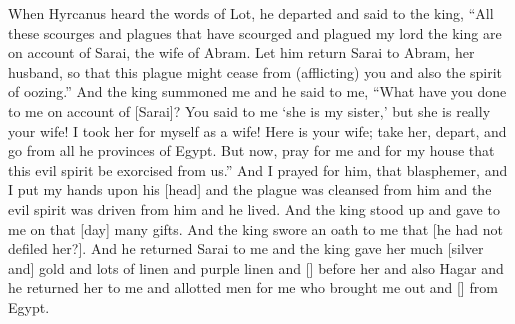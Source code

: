 \begin{translation}
    When Hyrcanus heard  the words of Lot, he departed and said to the king, ``All these scourges and plagues
    that have scourged and plagued my lord the king  are on account of Sarai, the wife of Abram. Let him return Sarai to Abram, her husband,
    so that this plague might cease from (afflicting) you and also the spirit of oozing.'' And the king summoned me and he said to me, ``What have you done to me on account of [Sarai]? You said
    to me `she is my sister,' but she is really your wife! I took her for myself as a wife! Here is your wife; take her, depart, and go from
    all he provinces of Egypt. But now, pray for me and for my house that this evil spirit be exorcised from us.'' And I prayed for him, that blasphemer,
    and I put my hands upon his [head] and the plague was cleansed from him and the evil spirit was driven from him and he lived. And the king stood up and gave
    to me on that [day] many gifts. And the king swore an oath to me that [he had not defiled her?]. And he returned Sarai to me
    and the king gave her much [silver and] gold and lots of linen and purple linen and [\hspace{1em}]
    before her and also Hagar and he returned her to me and allotted men for me who brought me out and [\hspace{0.5em}] from Egypt.
\end{translation}